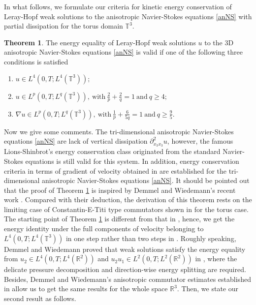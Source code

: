 \documentclass[11pt]{article}
\theoremstyle{plain}\newtheorem{definition}{Definition}[section]
\theoremstyle{definition}\newtheorem{theorem}{Theorem}[section]
\theoremstyle{plain}\newtheorem{lemma}[theorem]{Lemma}
\theoremstyle{plain}\newtheorem{coro}[theorem]{Corollary}
\theoremstyle{plain}\newtheorem{prop}[theorem]{Proposition}
\theoremstyle{remark}\newtheorem{remark}{Remark}[section]
\newcommand{\f}{\frac}
\numberwithin{equation}{section}
\begin{document}
In what follows, we formulate our criteria for kinetic energy conservation of Leray-Hopf weak solutions to the anisotropic Navier-Stokes equations \eqref{anNS} with partial dissipation for the torus domain $\mathbb{T}^3$.
\begin{theorem}\label{the1.1} The energy equality of Leray-Hopf weak solutions $u$ to the 3D anisotropic Navier-Stokes equations \eqref{anNS} is valid if one of the following three conditions is satisfied
 \begin{enumerate}[(1)]
 \item  $u \in L^{4}(0,T;L^{4}(\mathbb{T}^{3}));$
 \item $u\in L^{p}(0,T;L^{q}(\mathbb{T}^{3})),~\text{with}~\f{2}{p}+
 \f{2}{q}=1~\text{and}~q\geq 4;$
 \item  $\nabla u \in L^{p}(0, T ; L^{q}(\mathbb{T}^{3})),~\text{with}~
 \frac{1}{p}+\frac{6}{5 q}=1~\text{and}~q\geq \frac{9}{5}.$
\end{enumerate}
\end{theorem}
 Now we give some comments. The   tri-dimensional  anisotropic Navier-Stokes equations \eqref{anNS}  are lack of   vertical dissipation $\partial^{2}_{x_3x_3}u$, however, the famous Lions-Shinbrot's energy conservation class originated from the standard  Navier-Stokes equations is still valid for this system. In addition, energy conservation   criteria in terms of gradient of velocity obtained in \cite{[BC],[BY2],[Zhang]} are established
for the   tri-dimensional  anisotropic Navier-Stokes equations \eqref{anNS}.
   It should be pointed out that
the proof of Theorem \ref{the1.1} is inspired by Demmel and   Wiedemann's recent work \cite{[DW]}. Compared with their deduction, the derivation of this theorem rests on the limiting case of
 Constantin-E-Titi type commutators shown in \cite{[NNT],[WY]}  for the torus case. 
 The starting point of Theorem \ref{the1.1}   is different from that in  \cite{[DW]}, hence, we get the energy identity under the full components of velocity belonging to $   L^{4}(0,T;L^{4}(\mathbb{T}^{3}))$ in one step rather than two steps in \cite{[DW]}.
Roughly speaking, Demmel and   Wiedemann proved that weak solutions satisfy the energy equality from
  $u_{2}\in L^{4}(0,T;L^{4}(\mathbb{R}^{2}))$ and $u_{2}u_{1}\in L^{2}(0,T;L^{2}(\mathbb{R}^{2}))$ in \cite{[DW]}, where the delicate pressure decomposition and direction-wise energy splitting are required.   Besides, Demmel and   Wiedemann's  anisotropic  commutator estimates established in \cite{[DW]} allow us to get the same results for the whole space  $\mathbb{R}^3$. Then, we state our second result as follows.
\end{document}
